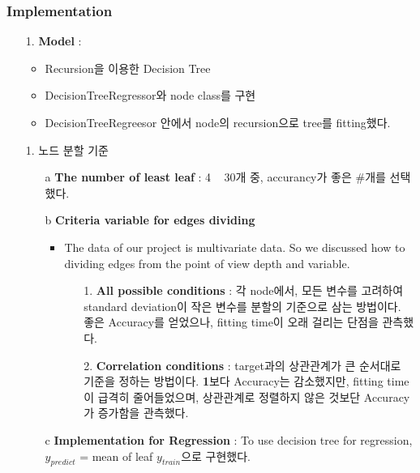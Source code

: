 \documentclass{article}
\begin{document}
\subsubsection{Implementation}
\begin{itemize}
    \item[1.] \textbf{Model} : 
        \begin{itemize}
            \item Recursion을 이용한 Decision Tree
            \item DecisionTreeRegressor와 node class를 구현
            \item DecisionTreeRegreesor 안에서 node의 recursion으로 tree를 fitting했다.
        \end{itemize}
    \item[1.] 노드 분할 기준
        \begin{itemize}
            \item[a] \textbf{The number of least leaf} : 4 ~ 30개 중, accurancy가 좋은 #개를 선택했다.
            \item[b] \textbf{Criteria variable for edges dividing}
                \begin{itemize}
                    \item The data of our project is multivariate data. So we discussed how to dividing edges from the point of view depth and variable.
                    \begin{itemize}
                        \item[1.] \textbf{All possible conditions} : 각 node에서, 모든 변수를 고려하여 standard deviation이 작은 변수를 분할의 기준으로 삼는 방법이다. 좋은 Accuracy를 얻었으나, fitting time이 오래 걸리는 단점을 관측했다.
                        
                        \item[2.] \textbf{Correlation conditions} : target과의 상관관계가 큰 순서대로 기준을 정하는 방법이다. \textbf{1}보다 Accuracy는 감소했지만, fitting time이 급격히 줄어들었으며, 상관관계로 정렬하지 않은 것보단 Accuracy가 증가함을 관측했다. 
                    \end{itemize}
                \end{itemize}
            \item[c] \textbf{Implementation for Regression} : To use decision tree for regression, $y_{predict}$ = mean of leaf $y_{train}$으로 구현했다.
        \end{itemize}
\end{itemize}
\end{document}
